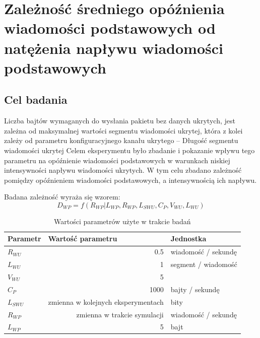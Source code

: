 \documentclass[a4paper, twoside, 12pt]{report}
\begin{document}
    \section{Zależność średniego opóźnienia wiadomości podstawowych od natężenia napływu wiadomości podstawowych} \label{BADANIEDLUGOSCISEGMENTUDANYCHUKRYTYCH}
        \subsection{Cel badania}
            Liczba bajtów wymaganych do wysłania pakietu bez danych ukrytych,
            jest zależna od maksymalnej wartości segmentu wiadomości ukrytej, która
            z kolei zależy od parametru konfiguracyjnego kanału ukrytego -- Długość segmentu wiadomości ukrytej
            Celem eksperymentu było zbadanie i pokazanie wpływu tego parametru
            na opóźnienie wiadomości podstawowych w warunkach niskiej intensywności
            napływu wiadomości ukrytych. W tym celu zbadano zależność pomiędzy
            opóźnieniem wiadomości podstawowych, a intensywnością ich napływu.

            Badana zależność wyraża się wzorem: \\
                $$ D_{WP} = f(R_{WP} | L_{WP}, R_{WP}, L_{SWU}, C_P, V_{WU}, L_{WU}) $$
            \begin{table}[h]
                \centering
                \begin{tabular}{ | l | r | l | }
                    \hline
                    {\bfseries Parametr} & \multicolumn{1}{|l|}{{\bfseries Wartość parametru}} & {\bfseries Jednostka} \\ \hline
                    \( R_{WU} \) & 0.5 & wiadomość / sekundę \\ \hline
                    \( L_{WU} \) & 1 & segment / wiadomość \\ \hline
                    \( V_{WU} \) & 5 & \\ \hline
                    \( C_P \) & 1000 & bajty / sekundę \\ \hline
                    \( L_{SWU} \) & zmienna w kolejnych eksperymentach & bity \\ \hline
                    \( R_{WP} \) & zmienna w trakcie symulacji & wiadomość / sekundę  \\ \hline
                    \( L_{WP} \) & 5 & bajt \\ \hline
                \end{tabular}
                \caption{Wartości parametrów użyte w trakcie badań}
            \end{table}
\end{document}
